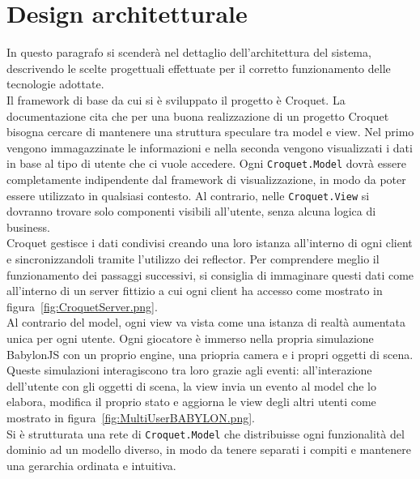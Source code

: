 \section{Design architetturale}\label{sec:design}
In questo paragrafo si scenderà nel dettaglio dell'architettura del sistema, descrivendo le scelte progettuali effettuate per il corretto funzionamento delle tecnologie adottate.\\
\newline
Il framework di base da cui si è sviluppato il progetto è Croquet. La documentazione cita che per una buona realizzazione di un progetto Croquet bisogna cercare di mantenere una 
struttura speculare tra model e view. Nel primo vengono immagazzinate le informazioni e nella seconda vengono visualizzati i dati in base al tipo di utente che ci vuole accedere.
Ogni \texttt{Croquet.Model} dovrà essere completamente indipendente dal framework di visualizzazione, in modo da poter essere utilizzato in qualsiasi contesto. Al contrario, nelle
\texttt{Croquet.View} si dovranno trovare solo componenti visibili all'utente, senza alcuna logica di business.\\
Croquet gestisce i dati condivisi creando una loro istanza all'interno di ogni client e sincronizzandoli tramite l'utilizzo dei reflector. Per comprendere meglio il funzionamento
dei passaggi successivi, si consiglia di immaginare questi dati come all'interno di un server fittizio a cui ogni client ha accesso come mostrato in figura~\ref{fig:CroquetServer.png}.\\
Al contrario del model, ogni view va vista come una istanza di realtà aumentata unica per ogni utente. Ogni giocatore è immerso nella propria simulazione BabylonJS con un proprio engine,
una priopria camera e i propri oggetti di scena. Queste simulazioni interagiscono tra loro grazie agli eventi: all'interazione dell'utente con gli oggetti di scena, la view invia un
evento al model che lo elabora, modifica il proprio stato e aggiorna le view degli altri utenti come mostrato in figura~\ref{fig:MultiUserBABYLON.png}.\\
Si è strutturata una rete di \texttt{Croquet.Model} che distribuisse ogni funzionalità del dominio ad un modello diverso, in modo da tenere separati i compiti e mantenere una
gerarchia ordinata e intuitiva.\\



